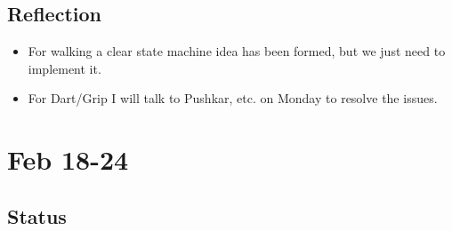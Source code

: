\documentclass[letterpaper, 10 pt]{report}
\begin{document}
\subsection*{Reflection}
\begin{itemize}
\item For walking a clear state machine idea has been formed, but we just need
to implement it.
\item For Dart/Grip I will talk to Pushkar, etc. on Monday to resolve the issues.
\end{itemize}

\section*{Feb 18-24}
\subsection*{Status}
\end{document}
